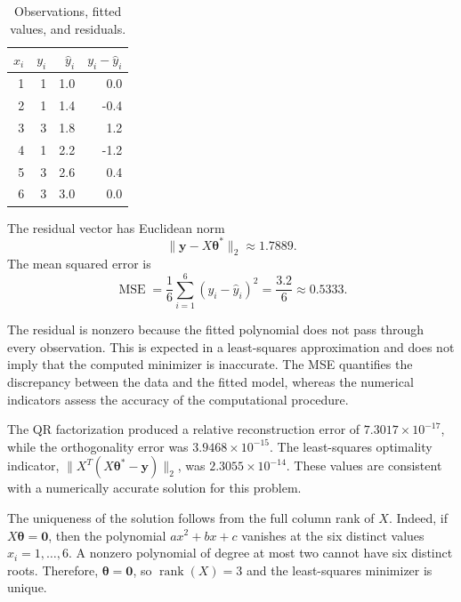 \begin{table}[htbp]
    \centering
    \small
    \caption{Observations, fitted values, and residuals.}
    \label{tab:quadratic-fit-results}
    \begin{tabular}{rrrr}
        \hline
        $x_i$ & $y_i$ & $\widehat{y}_i$ & $y_i-\widehat{y}_i$ \\
        \hline
        1     & 1     & 1.0             & 0.0                 \\
        2     & 1     & 1.4             & -0.4                \\
        3     & 3     & 1.8             & 1.2                 \\
        4     & 1     & 2.2             & -1.2                \\
        5     & 3     & 2.6             & 0.4                 \\
        6     & 3     & 3.0             & 0.0                 \\
        \hline
    \end{tabular}
\end{table}

The residual vector has Euclidean norm
\begin{equation}
    \|\mathbf{y}-X\boldsymbol{\theta}^{*}\|_2
    \approx 1.7889.
\end{equation}
The mean squared error is
\begin{equation}
    \operatorname{MSE}
    =\frac{1}{6}\sum_{i=1}^{6}
    (y_i-\widehat{y}_i)^2
    =\frac{3.2}{6}
    \approx 0.5333.
    \label{eq:quadratic-mse}
\end{equation}

The residual is nonzero because the fitted polynomial does not
pass through every observation. This is expected in a least-squares
approximation and does not imply that the computed minimizer is
inaccurate. The MSE quantifies the discrepancy between the data
and the fitted model, whereas the numerical indicators assess the
accuracy of the computational procedure.

The QR factorization produced a relative reconstruction error of
$7.3017\times10^{-17}$, while the orthogonality error was
$3.9468\times10^{-15}$. The least-squares optimality indicator,
$\|X^T(X\boldsymbol{\theta}^{*}-\mathbf{y})\|_2$, was
$2.3055\times10^{-14}$. These values are consistent with a
numerically accurate solution for this problem.

The uniqueness of the solution follows from the full column
rank of $X$. Indeed, if
$X\boldsymbol{\theta}=\mathbf{0}$, then the polynomial
$a x^2+bx+c$ vanishes at the six distinct values
$x_i=1,\ldots,6$. A nonzero polynomial of degree at most two
cannot have six distinct roots. Therefore,
$\boldsymbol{\theta}=\mathbf{0}$, so
$\operatorname{rank}(X)=3$ and the least-squares minimizer is
unique.

